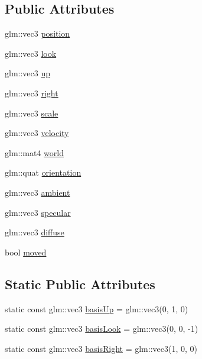 \subsection*{Public Attributes}
\begin{DoxyCompactItemize}
\item 
glm\-::vec3 \hyperlink{class_b_g_e_1_1_transform_a6ed8b5c863f8194874bb7f67050ad733}{position}
\item 
glm\-::vec3 \hyperlink{class_b_g_e_1_1_transform_a26a45bbb5d264d4a6c1dce74c25e4b01}{look}
\item 
glm\-::vec3 \hyperlink{class_b_g_e_1_1_transform_ad728f83369928a7409b3c889113651b4}{up}
\item 
glm\-::vec3 \hyperlink{class_b_g_e_1_1_transform_a33fed54241b66010041f63193b920dd0}{right}
\item 
glm\-::vec3 \hyperlink{class_b_g_e_1_1_transform_ad788c54156f11fcfcd00946b7617a4ae}{scale}
\item 
glm\-::vec3 \hyperlink{class_b_g_e_1_1_transform_a202d73d14f1c9c756645cb75acfb72de}{velocity}
\item 
glm\-::mat4 \hyperlink{class_b_g_e_1_1_transform_a1111c3693593c94d9d559dab14070b8d}{world}
\item 
glm\-::quat \hyperlink{class_b_g_e_1_1_transform_a34cb89e882e27db3bc4b42364f9209d7}{orientation}
\item 
glm\-::vec3 \hyperlink{class_b_g_e_1_1_transform_a62b72900cf41dbeeebcc115c9ffba8e2}{ambient}
\item 
glm\-::vec3 \hyperlink{class_b_g_e_1_1_transform_a3b4fe0e657be15a4b9a4e768a5bd35d9}{specular}
\item 
glm\-::vec3 \hyperlink{class_b_g_e_1_1_transform_ae7028b3d27235e33ae62f36256e0d8ff}{diffuse}
\item 
bool \hyperlink{class_b_g_e_1_1_transform_a7898a1ec8e3133d07f8961cb117697d9}{moved}
\end{DoxyCompactItemize}
\subsection*{Static Public Attributes}
\begin{DoxyCompactItemize}
\item 
static const glm\-::vec3 \hyperlink{class_b_g_e_1_1_transform_a4138712e358f3407c2e581a577bba923}{basis\-Up} = glm\-::vec3(0, 1, 0)
\item 
static const glm\-::vec3 \hyperlink{class_b_g_e_1_1_transform_a00e3d00aedfea161e5c1354e5fe80a54}{basis\-Look} = glm\-::vec3(0, 0, -\/1)
\item 
static const glm\-::vec3 \hyperlink{class_b_g_e_1_1_transform_ab1f6463365cef7fdba189e99b519b7a5}{basis\-Right} = glm\-::vec3(1, 0, 0)
\end{DoxyCompactItemize}


